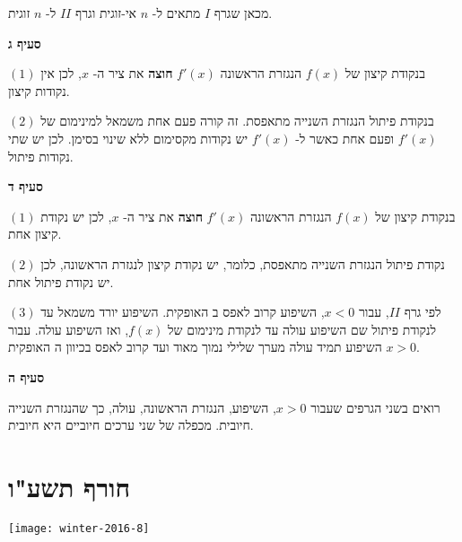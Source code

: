 מכאן שגרף
$I$
מתאים ל-%
$n$
אי-זוגית וגרף
$II$
ל-%
$n$
זוגית.

\textbf{סעיף ג}

$(1)$
בנקודת קיצון של
$f(x)$
הנגזרת הראשונה 
$f'(x)$
\textbf{חוצה}
את ציר ה-%
$x$,
לכן אין נקודות קיצון.

$(2)$
בנקודת פיתול הנגזרת השנייה מתאפסת. זה קורה פעם אחת משמאל למינימום של
$f'(x)$
ופעם אחת כאשר ל-%
$f'(x)$
יש נקודות מקסימום ללא שינוי בסימן. לכן יש שתי נקודות פיתול.

\textbf{סעיף ד}

$(1)$
בנקודת קיצון של
$f(x)$
הנגזרת הראשונה 
$f'(x)$
\textbf{חוצה}
את ציר ה-%
$x$,
לכן יש נקודת קיצון אחת.

$(2)$
נקודת פיתול הנגזרת השנייה מתאפסת, כלומר, יש נקודת קיצון לנגזרת הראשונה, לכן יש נקודת פיתול אחת.


$(3)$
לפי גרף 
$II$,
עבור
$x<0$,
השיפוע קרוב לאפס ב%
\asm{}
האופקית. השיפוע יורד משמאל עד לנקודת פיתול שם השיפוע עולה עד לנקודת מינימום של
$f(x)$,
ואז השיפוע עולה. עבור
$x>0$
השיפוע תמיד עולה מערך שלילי נמוך מאוד ועד קרוב לאפס בכיוון ה%
\asm{}
האופקית.

\begin{center}
\end{center}


\textbf{סעיף ה}

רואים בשני הגרפים שעבור
$x>0$,
השיפוע, הנגזרת הראשונה, עולה, כך שהנגזרת השנייה חיובית. מכפלה של שני ערכים חיוביים היא חיובית.


\np



\section{חורף תשע"ו}

\begin{center}
\texttt{[image: winter-2016-8]}

\end{center}

